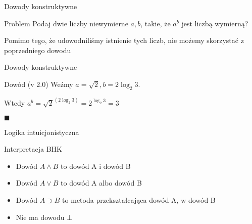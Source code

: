 \documentclass{beamer}
\begin{document}
\begin{frame}{Dowody konstruktywne}
  \begin{block}{Problem}
  Podaj dwie liczby niewymierne $a, b$, takie, że $a^b$ jest liczbą wymierną?
  \end{block}
  
  \pause
  
  \begin{alertblock}{}
  Pomimo tego, że udowodniliśmy istnienie tych liczb, nie możemy skorzystać z poprzedniego dowodu
  \end{alertblock}
\end{frame}

\begin{frame}{Dowody konstruktywne}
  \begin{block}{Dowód (v 2.0)}
  Weźmy $ a=\sqrt{2}, b=2\log_2{3} $.
  
  Wtedy $ a^b = \sqrt{2}^{(2\log_2{3})} = 2^{\log_2{3}} = 3 $
  
  $\blacksquare$
  \end{block}
\end{frame}

\begin{frame}{Logika intuicjonistyczna}

    \pause
    
    \begin{block}{Interpretacja BHK}
        \begin{itemize}[<+->]
            \item Dowód $ A \land B $ to dowód A i dowód B
            \item Dowód $ A \lor B $ to dowód A albo dowód B
            \item Dowód $ A \supset B $ to metoda przekształcająca dowód A, w dowód B
            \item Nie ma dowodu $\bot$
        \end{itemize}
    \end{block}
\end{frame}
\end{document}

